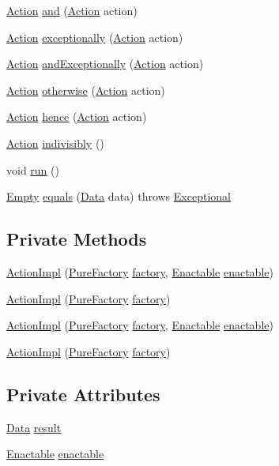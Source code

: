 \begin{CompactItemize}
\hyperlink{interfaceAction}{Action} \hyperlink{classActionImpl_a14}{and} (\hyperlink{interfaceAction}{Action} action)
\item 
\hyperlink{interfaceAction}{Action} \hyperlink{classActionImpl_a15}{exceptionally} (\hyperlink{interfaceAction}{Action} action)
\item 
\hyperlink{interfaceAction}{Action} \hyperlink{classActionImpl_a16}{and\-Exceptionally} (\hyperlink{interfaceAction}{Action} action)
\item 
\hyperlink{interfaceAction}{Action} \hyperlink{classActionImpl_a17}{otherwise} (\hyperlink{interfaceAction}{Action} action)
\item 
\hyperlink{interfaceAction}{Action} \hyperlink{classActionImpl_a18}{hence} (\hyperlink{interfaceAction}{Action} action)
\item 
\hyperlink{interfaceAction}{Action} \hyperlink{classActionImpl_a19}{indivisibly} ()
\item 
void \hyperlink{classActionImpl_a20}{run} ()
\item 
\hyperlink{interfaceEmpty}{Empty} \hyperlink{classActionImpl_a21}{equals} (\hyperlink{interfaceData}{Data} data) throws \hyperlink{classExceptional}{Exceptional}
\end{CompactItemize}
\subsection*{Private Methods}
\begin{CompactItemize}
\item 
\hyperlink{classActionImpl_c0}{Action\-Impl} (\hyperlink{classPureFactory}{Pure\-Factory} \hyperlink{classDataImpl_o0}{factory}, \hyperlink{interfaceEnactable}{Enactable} \hyperlink{classActionImpl_o1}{enactable})
\item 
\hyperlink{classActionImpl_c1}{Action\-Impl} (\hyperlink{classPureFactory}{Pure\-Factory} \hyperlink{classDataImpl_o0}{factory})
\item 
\hyperlink{classActionImpl_c2}{Action\-Impl} (\hyperlink{classPureFactory}{Pure\-Factory} \hyperlink{classDataImpl_o0}{factory}, \hyperlink{interfaceEnactable}{Enactable} \hyperlink{classActionImpl_o1}{enactable})
\item 
\hyperlink{classActionImpl_c3}{Action\-Impl} (\hyperlink{classPureFactory}{Pure\-Factory} \hyperlink{classDataImpl_o0}{factory})
\end{CompactItemize}
\subsection*{Private Attributes}
\begin{CompactItemize}
\item 
\hyperlink{interfaceData}{Data} \hyperlink{classActionImpl_o0}{result}
\item 
\hyperlink{interfaceEnactable}{Enactable} \hyperlink{classActionImpl_o1}{enactable}
\end{CompactItemize}


